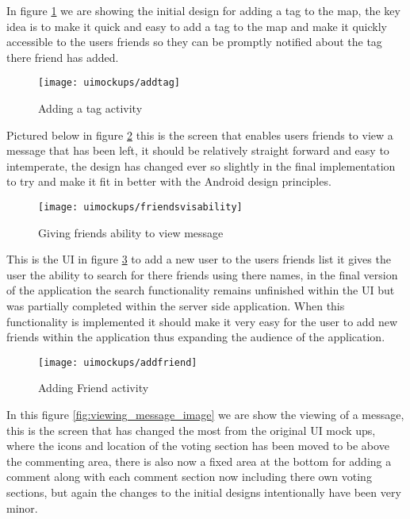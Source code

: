 \noindent
In figure \ref{fig:add_tag_activity_image} we are showing the initial design for adding a tag to the map, the key idea is to make it quick and easy to add a tag to the map and make it quickly accessible to the users friends so they can be promptly notified about the tag there friend has added.\\

\begin{figure}[h!]
    \centering
    \texttt{[image: uimockups/addtag]}
    \caption{Adding a tag activity}
    \label{fig:add_tag_activity_image}
\end{figure}

\noindent
Pictured below in figure \ref{fig:giving_friends_visability_image} this is the screen that enables users friends to view a message that has been left, it should be relatively straight forward and easy to intemperate, the design has changed ever so slightly in the final implementation to try and make it fit in better with the Android design principles.\\

\begin{figure}[h!]
    \centering
    \texttt{[image: uimockups/friendsvisability]}
    \caption{Giving friends ability to view message}
    \label{fig:giving_friends_visability_image}
\end{figure} 

\noindent
This is the UI in figure \ref{fig:add_friend_activity_image} to add a new user to the users friends list it gives the user the ability to search for there friends using there names, in the final version of the application the search functionality remains unfinished within the UI but was partially completed within the server side application. When this functionality is implemented it should make it very easy for the user to add new friends within the application thus expanding the audience of the application.\\

\begin{figure}[h!]
    \centering
    \texttt{[image: uimockups/addfriend]}
    \caption{Adding Friend activity}
    \label{fig:add_friend_activity_image}
\end{figure} 

\noindent
In this figure \ref{fig:viewing_message_image} we are show the viewing of a message, this is the screen that has changed the most from the original UI mock ups, where the icons and location of the voting section has been moved to be above the commenting area, there is also now a fixed area at the bottom for adding a comment along with each comment section now including there own voting sections, but again the changes to the initial designs intentionally have been very minor.\\

